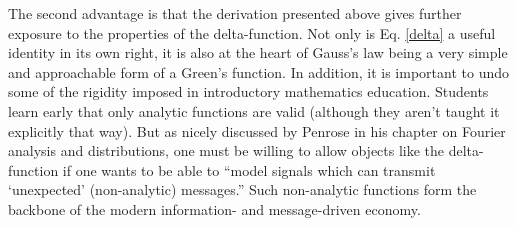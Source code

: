 \documentclass{article}
\begin{document}
The second advantage is that the derivation presented above gives further exposure to the properties of the 
delta-function.  Not only is Eq. \ref{delta} a useful identity in its own right, it is also at the heart of 
Gauss's law being a very simple and approachable form of a Green's function.  In addition, it is important
to undo some of the rigidity imposed in introductory mathematics education.  Students learn early that only analytic
functions are valid (although they aren't taught it explicitly that way).  But as nicely discussed by Penrose 
\cite{Penrose} in his chapter on Fourier analysis and distributions, one must be willing to allow objects 
like the delta-function if one wants to be able to ``model signals which can transmit `unexpected' (non-analytic) 
messages.''  Such non-analytic functions form the backbone of the modern information- and message-driven economy.
\end{document}
